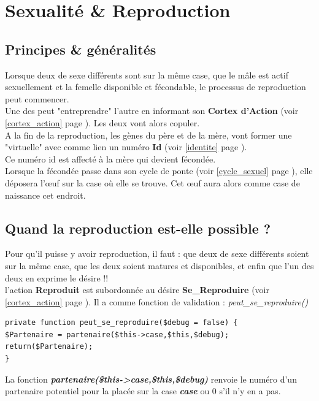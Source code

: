 \documentclass[french]{report}
\begin{document}
\chapter{Sexualité \& Reproduction}\label{sexualite}
\section{Principes \& généralités}

Lorsque deux \CoCiX de sexe différents sont sur la même case, que le mâle est actif sexuellement et la femelle disponible et fécondable, le processus de reproduction peut commencer.\\
Une des \CoCiX peut "entreprendre" l'autre en informant son \textbf{Cortex d'Action} (voir \ref{cortex_action} page \pageref{cortex_action}). Les deux \CoCiX vont alors copuler.\\
A la fin de la reproduction, les gènes du père et de la mère, vont former une \CoCiX "virtuelle" avec comme lien un numéro \textbf{Id\textit{}} (voir \ref{identite} page \pageref{identite}).\\
Ce numéro id est affecté à la mère qui devient fécondée.\\
Lorsque la \CoCiX fécondée passe dans son cycle de ponte (voir \ref{cycle_sexuel} page \pageref{cycle_sexuel}), elle déposera l’œuf sur la case où elle se trouve. Cet œuf aura alors comme case de naissance cet endroit.\\

\section{Quand la reproduction est-elle possible ?}

Pour qu'il puisse y avoir reproduction, il faut  : que deux \CoCiX de sexe différents soient sur la même case, que les deux soient matures et disponibles, et enfin que l'un des deux en exprime le désire !!\\

l'action \textbf{Reproduit} est subordonnée au désire \textbf{Se\_Reproduire} (voir \ref{cortex_action} page \pageref{cortex_action}). Il a comme fonction de validation : \textit{peut\_se\_reproduire()} \\


\begin{lstlisting}[frame = single,caption={peut\_se\_reproduire()en PHP TODO}]
private function peut_se_reproduire($debug = false) {
$Partenaire = partenaire($this->case,$this,$debug);
return($Partenaire); 
}
\end{lstlisting}
La fonction \textbf{\textit{partenaire(\$this->case,\$this,\$debug)} }renvoie le numéro d'un partenaire potentiel pour la \CoCiX placée sur la case \textit{\textbf{case}} ou 0 s'il n'y en a pas.\\
\end{document}
